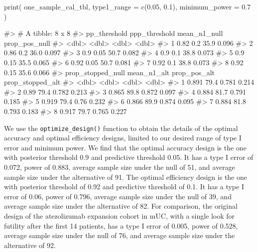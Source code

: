 \begin{Schunk}
\begin{Sinput}
print(
  one_sample_cal_tbl,
  type1_range = c(0.05, 0.1),
  minimum_power = 0.7
)
\end{Sinput}
\begin{Soutput}
#> # A tibble: 8 x 8
#>   pp_threshold ppp_threshold mean_n1_null prop_pos_null
#>          <dbl>         <dbl>        <dbl>         <dbl>
#> 1         0.82          0.2          35.9         0.096
#> 2         0.86          0.2          36.0         0.097
#> 3         0.9           0.05         50.7         0.082
#> 4         0.9           0.1          38.8         0.073
#> 5         0.9           0.15         35.5         0.065
#> 6         0.92          0.05         50.7         0.081
#> 7         0.92          0.1          38.8         0.073
#> 8         0.92          0.15         35.6         0.066
#>   prop_stopped_null mean_n1_alt prop_pos_alt prop_stopped_alt
#>               <dbl>       <dbl>        <dbl>            <dbl>
#> 1             0.891        79.4        0.781            0.214
#> 2             0.89         79.4        0.782            0.213
#> 3             0.865        89.8        0.872            0.097
#> 4             0.884        81.7        0.791            0.185
#> 5             0.919        79.4        0.76             0.232
#> 6             0.866        89.9        0.874            0.095
#> 7             0.884        81.8        0.793            0.183
#> 8             0.917        79.7        0.765            0.227
\end{Soutput}
\end{Schunk}

We use the \texttt{optimize\_design()} function to obtain the details of
the optimal accuracy and optimal efficiency designs, limited to our
desired range of type I error and minimum power. We find that the
optimal accuracy design is the one with posterior threshold 0.9 and
predictive threshold 0.05. It has a type I error of 0.072, power of
0.883, average sample size under the null of 51, and average sample size
under the alternative of 91. The optimal efficiency design is the one
with posterior threshold of 0.92 and predictive threshold of 0.1. It has
a type I error of 0.06, power of 0.796, average sample size under the
null of 39, and average sample size under the alternative of 82. For
comparison, the original design of the atezolizumab expansion cohort in
mUC, with a single look for futility after the first 14 patients, has a
type I error of 0.005, power of 0.528, average sample size under the
null of 76, and average sample size under the alternative of 92.

